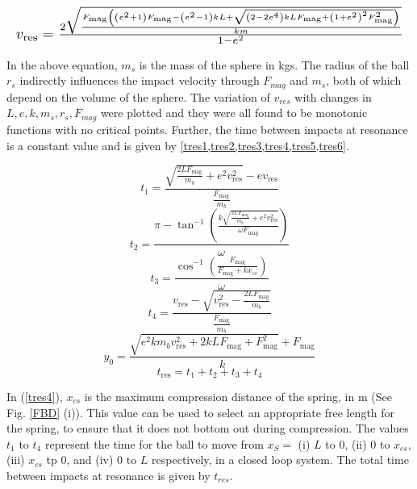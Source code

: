 \documentclass[letterpaper, 10 pt, conference]{ieeeconf}  %
\begin{document}
\begin{equation}
\resizebox{\linewidth}{!}
{$
v_{\text{res}}=\frac{2 \sqrt{\frac{F_{\text{mag}} \left(\left(e^2+1\right) F_{\text{mag}}-\left(e^2-1\right) k L+\sqrt{\left(2-2 e^4\right) k L F_{\text{mag}}+\left(1+e^2\right)^2 F_{\text{mag}}^2}\right)}{k m}}}{1-e^2}
$}
\label{Resonant_CLvelocity}
\end{equation}

In the above equation, $m_s$ is the mass of the sphere in kgs. The radius of the ball $r_s$ indirectly influences the impact velocity through $F_{mag}$ and $m_s$, both of which depend on the volume of the sphere. The variation of $v_{res}$ with changes in $L,e,k,m_s,r_s,F_{mag}$ were plotted and they were all found to be monotonic functions with no critical points. Further, the time between impacts at resonance is a constant value and is given by \cref{tres1,tres2,tres3,tres4,tres5,tres6}.
	
\begin{equation}
t_1=\frac{\sqrt{\frac{2 L F_{\text{mag}}}{m_b}+e^2 v_{\text{res}}^2}-e v_{\text{res}}}{\frac{F_{\text{mag}}}{m_b}}
\label{tres1}
\end{equation}
\begin{equation}
t_2=\frac{\pi -\tan ^{-1}\left(\frac{k \sqrt{\frac{2 L F_{\text{mag}}}{m_b}+e^2 v_{\text{res}}^2}}{\omega  F_{\text{mag}}}\right)}{\omega }
\label{tres2}
\end{equation}
\begin{equation}
t_3=\frac{\cos ^{-1}\left(\frac{F_{\text{mag}}}{F_{\text{mag}}+k x_{cs}}\right)}{\omega }
\label{tres3}
\end{equation}
\begin{equation}
t_4=\frac{v_{\text{res}}-\sqrt{v_{\text{res}}^2-\frac{2 L F_{\text{mag}}}{m_b}}}{\frac{F_{\text{mag}}}{m_b}}
\label{tres4}
\end{equation}
\begin{equation}
y_0=\frac{\sqrt{e^2 k m_b v_{\text{res}}^2+2 k L F_{\text{mag}}+F_{\text{mag}}^2}+F_{\text{mag}}}{k}
\label{tres5}
\end{equation}
\begin{equation}
t_{\text{res}}=t_1+t_2+t_3+t_4
\label{tres6}
\end{equation}

In (\ref{tres4}), $x_{cs}$ is the maximum compression distance of the spring, in m (See Fig. \ref{FBD} (i)). This value can be used to select an appropriate free length for the spring, to ensure that it does not bottom out during compression. The values $t_1$ to $t_4$ represent the time for the ball to move from $x_S =$ (i) $L$ to 0, (ii) 0 to $x_{cs}$, (iii) $x_{cs}$ tp 0, and (iv) 0 to $L$ respectively, in a closed loop system. The total time between impacts at resonance is given by $t_{res}$. 
\end{document}
